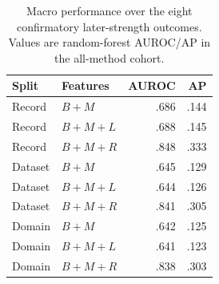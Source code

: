 \begin{table}[t]
\centering
\small
\caption{Macro performance over the eight confirmatory later-strength outcomes. Values are
random-forest AUROC/AP in the all-method cohort.}
\label{tab:split-macro}
\begin{tabular}{llrr}
\toprule
Split & Features & AUROC & AP \\
\midrule
Record & $B+M$ & .686 & .144 \\
Record & $B+M+L$ & .688 & .145 \\
Record & $B+M+R$ & .848 & .333 \\
Dataset & $B+M$ & .645 & .129 \\
Dataset & $B+M+L$ & .644 & .126 \\
Dataset & $B+M+R$ & .841 & .305 \\
Domain & $B+M$ & .642 & .125 \\
Domain & $B+M+L$ & .641 & .123 \\
Domain & $B+M+R$ & .838 & .303 \\
\bottomrule
\end{tabular}

\end{table}
